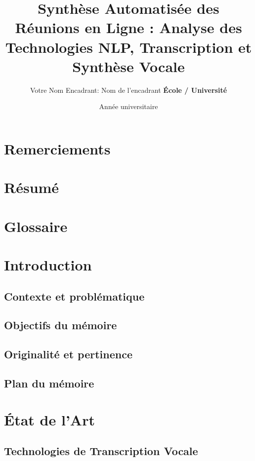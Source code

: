 \documentclass[12pt,a4paper]{report}
\title{\textbf{Synthèse Automatisée des Réunions en Ligne : \newline Analyse des Technologies NLP, Transcription et Synthèse Vocale}}
\author{Votre Nom \newline Encadrant: Nom de l'encadrant \newline \textbf{École / Université}}
\date{Année universitaire}
\begin{document}
\maketitle
\newpage

\chapter*{Remerciements}

\chapter*{Résumé}

\tableofcontents
\newpage

\listoffigures
\listoftables
\newpage

\chapter*{Glossaire}

\chapter{Introduction}
\section{Contexte et problématique}
\section{Objectifs du mémoire}
\section{Originalité et pertinence}
\section{Plan du mémoire}

\chapter{État de l’Art}
\section{Technologies de Transcription Vocale}
\end{document}
